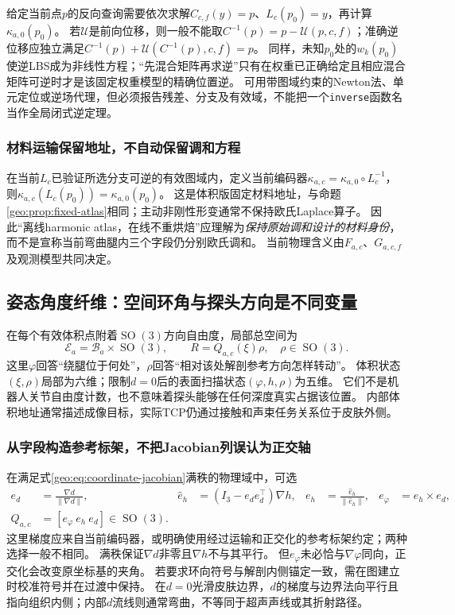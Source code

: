 \documentclass[11pt,a4paper]{article}
\numberwithin{equation}{section}
\theoremstyle{definition}
\DeclareMathOperator{\SO}{SO}
\newcommand{\norm}[1]{\left\lVert#1\right\rVert}
\begin{document}
给定当前点$p$的反向查询需要依次求解$C_{c,f}(y)=p$、$L_c(p_0)=y$，再计算$\kappa_{a,0}(p_0)$。
若$\mathcal U$是前向位移，则一般不能取$C^{-1}(p)=p-\mathcal U(p,c,f)$；准确逆位移应独立满足$C^{-1}(p)+\mathcal U(C^{-1}(p),c,f)=p$。
同样，未知$p_0$处的$w_k(p_0)$使逆LBS成为非线性方程；“先混合矩阵再求逆”只有在权重已正确给定且相应混合矩阵可逆时才是该固定权重模型的精确位置逆。
可用带图域约束的Newton法、单元定位或逆场代理，但必须报告残差、分支及有效域，不能把一个\texttt{inverse}函数名当作全局闭式逆定理。

\subsubsection{材料运输保留地址，不自动保留调和方程}
在当前$L_c$已验证所选分支可逆的有效图域内，定义当前编码器$\kappa_{a,c}=\kappa_{a,0}\circ L_c^{-1}$，则$\kappa_{a,c}(L_c(p_0))=\kappa_{a,0}(p_0)$。
这是体积版固定材料地址，与命题\ref{geo:prop:fixed-atlas}相同；主动非刚性形变通常不保持欧氏Laplace算子。
因此“离线harmonic atlas，在线不重烘焙”应理解为\emph{保持原始调和设计的材料身份}，而不是宣称当前弯曲腿内三个字段仍分别欧氏调和。
当前物理含义由$F_{a,c}$、$G_{a,c,f}$及观测模型共同决定。

\subsection{姿态角度纤维：空间环角与探头方向是不同变量}
\label{geo:sub:orientation-fiber}

在每个有效体积点附着$\SO(3)$方向自由度，局部总空间为
\begin{equation}
 \mathcal E_a=\mathcal B_a\times\SO(3),\qquad
 R=Q_{a,c}(\xi)\rho,\quad \rho\in\SO(3).
 \label{geo:eq:pose-bundle}
\end{equation}
这里$\varphi$回答“绕腿位于何处”，$\rho$回答“相对该处解剖参考方向怎样转动”。
体积状态$(\xi,\rho)$局部为六维；限制$d=0$后的表面扫描状态$(\varphi,h,\rho)$为五维。
它们不是机器人关节自由度计数，也不意味着探头能够在任何深度真实占据该位置。
内部体积地址通常描述成像目标，实际TCP仍通过接触和声束任务关系位于皮肤外侧。

\subsubsection{从字段构造参考标架，不把Jacobian列误认为正交轴}
在满足式\eqref{geo:eq:coordinate-jacobian}满秩的物理域中，可选
\begin{align}
 e_d&=\frac{\nabla d}{\norm{\nabla d}},
 &\widehat e_h&=(I_3-e_de_d^{\top})\nabla h,
 &e_h&=\frac{\widehat e_h}{\norm{\widehat e_h}},
 &e_\varphi&=e_h\times e_d,\\
 Q_{a,c}&=[e_\varphi\ e_h\ e_d]\in\SO(3).
 \label{geo:eq:anatomical-frame}
\end{align}
这里梯度应来自当前编码器，或明确使用经过运输和正交化的参考标架约定；两种选择一般不相同。
满秩保证$\nabla d$非零且$\nabla h$不与其平行。
但$e_\varphi$未必恰与$\nabla\varphi$同向，正交化会改变原坐标基的夹角。
若要求环向符号与解剖内侧锚定一致，需在图建立时校准符号并在过渡中保持。
在$d=0$光滑皮肤边界，$d$的梯度与边界法向平行且指向组织内侧；内部$d$流线则通常弯曲，不等同于超声声线或其折射路径。
\end{document}

